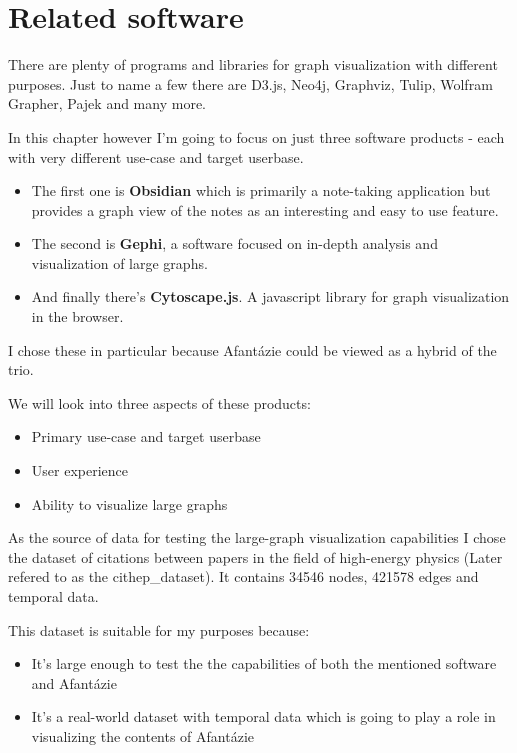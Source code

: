 \chapter{Related software}

There are plenty of programs and libraries for \gls{graph} visualization with different purposes.
Just to name a few there are D3.js, Neo4j, Graphviz, Tulip, Wolfram Grapher, Pajek and many more.

In this chapter however I'm going to focus on just three software products - each with very different use-case and target userbase.

\begin{itemize}

\item The first one is \textbf{Obsidian} which is primarily a note-taking application
but provides a graph view of the notes as an interesting and easy to use feature. 

\item The second is \textbf{Gephi}, a software focused on in-depth analysis and visualization of large graphs.

\item And finally there's \textbf{Cytoscape.js}. A javascript library for graph visualization in the browser.

\end{itemize}

I chose these in particular because Afantázie could be viewed as a hybrid of the trio.

We will look into three aspects of these products:
\begin{itemize}
  \item Primary use-case and target userbase
  \item User experience
  \item Ability to visualize large graphs
\end{itemize}

As the source of data for testing the large-graph visualization capabilities I chose the dataset of citations between papers
in the field of high-energy physics \cite{snap_cit_hep} (Later refered to as the \gls{cithep_dataset}).
It contains 34546 nodes, 421578 edges and temporal data.

This dataset is suitable for my purposes because:
\begin{itemize}
  \item It's large enough to test the the capabilities of both the mentioned software and Afantázie
  \item It's a real-world dataset with temporal data which is going to play a role in visualizing the contents of Afantázie
\end{itemize}

